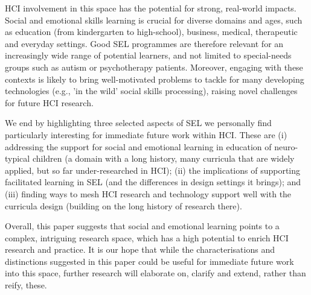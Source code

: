 \documentclass[prodmode,acmtochi]{acmsmall}
\newcommand{\todo}[1]{\textrm{\textrm{\textcolor{LightBlue}{[[#1]]} } } }
\begin{document}
HCI involvement in this space has the potential for strong, real-world impacts.
%
Social and emotional skills learning is crucial for diverse domains and ages, such as education (from kindergarten to high-school), business, medical, therapeutic and everyday settings. Good SEL programmes are therefore relevant for an increasingly wide range of potential learners, and not limited to special-needs groups such as autism or psychotherapy patients.
%
Moreover, engaging with these contexts is likely to bring well-motivated problems to tackle for many developing technologies (e.g., 'in the wild' social skills processing), raising novel challenges for future HCI research.


We end by highlighting three selected aspects of SEL we personally find particularly interesting for immediate future work within HCI. These are (i) addressing the support for social and emotional learning in education of neuro-typical children (a domain with a long history, many curricula that are widely applied, but so far under-researched in HCI); (ii) the implications of supporting facilitated learning in SEL (and the differences in design settings it brings); and (iii) finding ways to mesh HCI research and technology support well with the curricula design (building on the long history of research there).
%


Overall, this paper suggests that social and emotional learning points to a complex, intriguing research space, which has a high potential to enrich HCI research and practice.
%
It is our hope that while the characterisations and distinctions suggested in this paper could be useful for immediate future work into this space, further research will elaborate on, clarify and extend, rather than reify, these.
\end{document}

